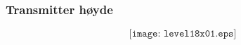 \documentclass[aspectratio=169,xcolor=dvipsnames]{beamer}
\begin{document}
%
%
%
\begin{frame}
	\frametitle{Transmitter høyde}

	$$\texttt{[image: level18x01.eps]}$$
\end{frame}
%
%
\end{document}
